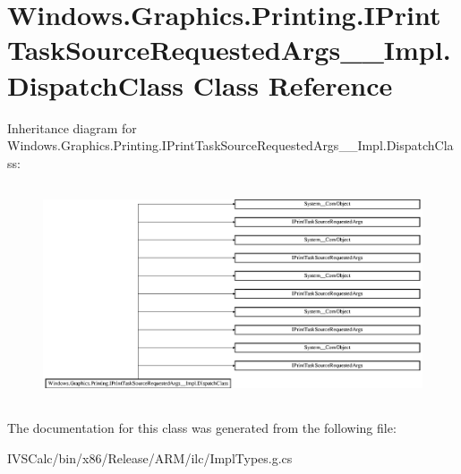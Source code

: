 \hypertarget{class_windows_1_1_graphics_1_1_printing_1_1_i_print_task_source_requested_args_____impl_1_1_dispatch_class}{}\section{Windows.\+Graphics.\+Printing.\+I\+Print\+Task\+Source\+Requested\+Args\+\_\+\+\_\+\+Impl.\+Dispatch\+Class Class Reference}
\label{class_windows_1_1_graphics_1_1_printing_1_1_i_print_task_source_requested_args_____impl_1_1_dispatch_class}
Inheritance diagram for Windows.\+Graphics.\+Printing.\+I\+Print\+Task\+Source\+Requested\+Args\+\_\+\+\_\+\+Impl.\+Dispatch\+Class\+:\begin{figure}[H]
\begin{center}
\leavevmode
\includegraphics[height=6.457023cm]{class_windows_1_1_graphics_1_1_printing_1_1_i_print_task_source_requested_args_____impl_1_1_dispatch_class}
\end{center}
\end{figure}


The documentation for this class was generated from the following file\+:\begin{DoxyCompactItemize}
\item 
I\+V\+S\+Calc/bin/x86/\+Release/\+A\+R\+M/ilc/Impl\+Types.\+g.\+cs\end{DoxyCompactItemize}
